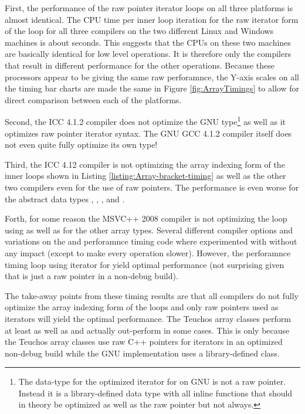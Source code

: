 \documentclass[pdf,ps2pdf,11pt]{SANDreport}
\begin{document}
First, the performance of the raw pointer iterator loops on all three
platforms is almost identical.  The CPU time per inner loop iteration
for the raw iterator form of the loop for all three compilers on the
two different Linux and Windows machines is about {}
seconds.  This suggests that the CPUs on these two machines are
basically identical for low level operations.  It is therefore only
the compilers that result in different performance for the other
operations.  Because these processors appear to be giving the same raw
perforamnce, the Y-axis scales on all the timing bar charts are made
the same in Figure {}\ref{fig:ArrayTimings} to allow for direct
comparison between each of the platforms.

Second, the ICC 4.1.2 compiler does not optimize the GNU
{} type\footnote{The data-type for the
optimized iterator for {} on GNU is not
a raw pointer.  Instead it is a library-defined data type with all
inline functions that should in theory be optimized as well as the raw
pointer but not always.} as well as it optimizes raw pointer iterator
syntax.  The GNU GCC 4.1.2 compiler itself does not even quite fully
optimize its own {} type!

Third, the ICC 4.12 compiler is not optimizing the array indexing form
of the inner loops shown in Listing
{}\ref{listing:Array-bracket-timing} as well as the other two
compilers even for the use of raw pointers.  The performance is even
worse for the abstract data types {},
{}, {}, and {}.

Forth, for some reason the MSVC++ 2008 compiler is not optimizing the
loop using {} as well as for
the other array types.  Several different compiler options and
variations on the {} and perforamnce timing code
where experimented with without any impact (except to make every
operation slower).  However, the perforamnce timing loop using
iterator for {} yield optimal performance (not
surprising given that {} is just a raw
pointer in a non-debug build).

The take-away points from these timing results are that all compilers
do not fully optimize the array indexing form of the loops and only
raw pointers used as iterators will yield the optimal performance.
The Teuchos array classes perform at least as well as
{} and actually out-perform {} in
some cases.  This is only because the Teuchos array classes use raw
C++ pointers for iterators in an optimized non-debug build while the
GNU implementation {} uses a library-defined class.
\end{document}
